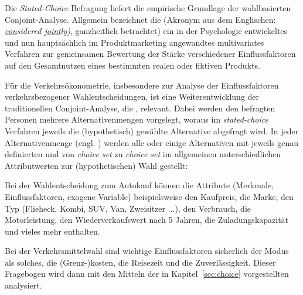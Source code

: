 Die \textit{Stated-Choice} Befragung liefert die empirische Grundlage der
wahlbasierten Conjoint-Analyse. Allgemein bezeichnet die
 (Akronym aus dem Englischen:
\emph{ \underline{con}sidered \underline{joint}ly)}, ganzheitlich betrachtet)
ein in der Psychologie entwickeltes und nun haupts\"achlich im
Produktmarketing angewandtes multivariates Verfahren zur gemeinsamen
Bewertung der St\"arke verschiedener Einflussfaktoren auf den Gesamtnutzen
eines bestimmten realen oder fiktiven Produkts.

F\"ur die Verkehrs\"okonometrie, insbesondere zur Analyse der Einflussfaktoren
verkehrsbezogener Wahlentscheidungen, ist eine Weiterentwicklung der traditionellen
Conjoint-Analyse, die , relevant. Dabei
werden den befragten Personen mehrere Alternativenmengen vorgelegt, woraus im
\emph{stated-choice} Verfahren jeweils die (hypothetisch) gew\"ahlte
Alternative abgefragt wird. In jeder Alternativenmenge (engl. ) werden alle oder einige Alternativen mit jeweils genau definierten und von
\emph{choice set} zu \emph{choice set} im allgemeinen unterschiedlichen
Attributwerten zur (hypothetischen) Wahl gestellt: 
\bi
\item Bei der Wahlentscheidung zum Autokauf k\"onnen die Attribute
  (Merkmale, Einflussfaktoren, exogene Variable)
  beispielsweise den Kaufpreis, die Marke, den Typ (Flie\3heck, Kombi, SUV,
  Van, Zweisitzer ...), den Verbrauch, die Motorleistung,
  den Wiederverkaufswert nach 5 Jahren, die Zuladungskapazit\"at und vieles
  mehr enthalten.
\item Bei der Verkehrsmittelwahl sind wichtige Einflussfaktoren sicherlich der
  Modus als solches, die
  (Grenz-)kosten, die Reisezeit und die Zuverl\"assigkeit.
\ei
Dieser Fragebogen wird dann mit den Mitteln der in
Kapitel~\ref{sec:choice} vorgestellten 
analysiert.

